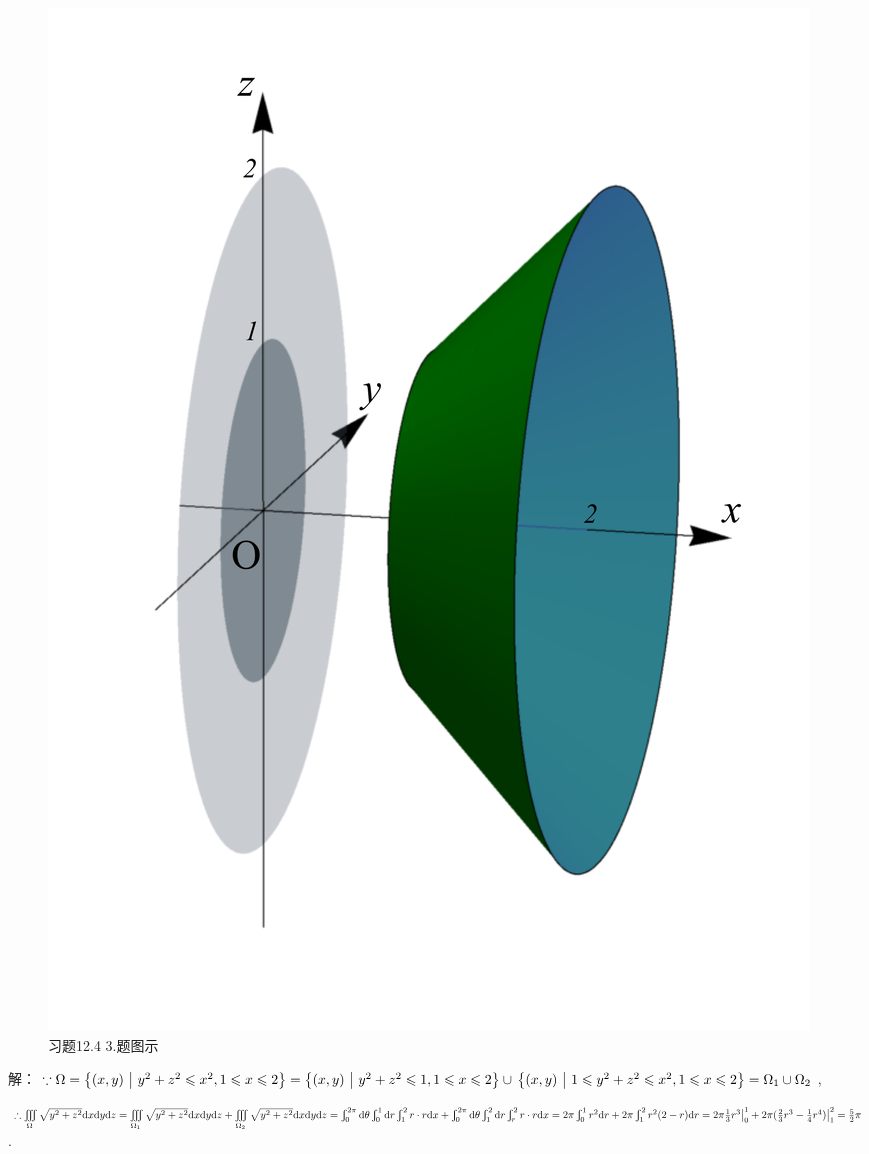 \documentclass[12pt,UTF8]{ctexart}
\newcommand\Set[2]{\left\{#1\ \middle\vert\ #2 \right\}}
\newcommand{\Int}[4]{\varint\nolimits_{#1}^{#2}#3\mathrm d#4}
\newcommand{\varIIInt}[5]{\iiint\limits_{#1}#2\mathrm d#3\mathrm d#4\mathrm d#5}
\begin{document}
\begin{enumerate}
\begin{figure}[H]
\begin{center}
\includegraphics[height=0.4\textheight]{Figures19/Fig12-4-3.pdf}
\end{center}
\caption{习题12.4 3.题图示}
\label{12-4-3}
\end{figure}

解：$\because\Omega=\Set{(x,y)}{y^2+z^2\leqslant x^2,1\leqslant x\leqslant2}=\Set{(x,y)}{y^2+z^2\leqslant1,1\leqslant x\leqslant2}\cup\\
\Set{(x,y)}{1\leqslant y^2+z^2\leqslant x^2,1\leqslant x\leqslant2}=\Omega_1\cup\Omega_2$,

$\therefore\varIIInt\Omega{\sqrt{y^2+z^2}}xyz=\varIIInt{\Omega_1}{\sqrt{y^2+z^2}}xyz+\varIIInt{\Omega_2}{\sqrt{y^2+z^2}}xyz\\
=\Int0{2\pi}{}\theta\Int01{}r\Int12{r\cdot r}x+\Int0{2\pi}{}\theta\Int12{}r\Int r2{r\cdot r}x=2\pi\Int01{r^2}r+2\pi\Int12{r^2(2-r)}r\\
=2\pi\frac13r^3\big|_0^1+2\pi(\frac23r^3-\frac14r^4)\big|_1^2=\frac52\pi$.


\end{enumerate}
\end{document}
